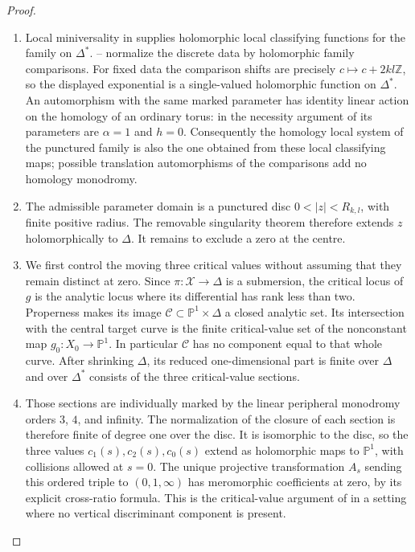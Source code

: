 \begin{proof}

\begin{enumerate}[label={$\langle1\rangle$\arabic*.},leftmargin=*]
\item Local miniversality in  supplies holomorphic local
classifying functions for the family on $\Delta^*$.
-- normalize the discrete data by holomorphic
family comparisons.  For fixed data the comparison shifts
are precisely $c\mapsto c+2kl\mathbb Z$, so the displayed
exponential is a single-valued holomorphic function on
$\Delta^*$.  An automorphism with the same marked parameter
has identity linear action on the homology of an ordinary
torus: in the necessity argument of  its parameters
are $\alpha=1$ and $h=0$.  Consequently the homology local
system of the punctured family is also the one obtained
from these local classifying maps; possible translation
automorphisms of the comparisons add no homology monodromy.

\item The admissible parameter domain is a punctured disc
$0<|z|<R_{k,l}$, with finite positive radius.  The removable
singularity theorem therefore extends $z$ holomorphically
to $\Delta$.  It remains to exclude a zero at the centre.

\item We first control the moving three critical values without
assuming that they remain distinct at zero.  Since
$\pi:\mathcal X\to\Delta$ is a submersion, the critical
locus of $g$ is the analytic locus where its differential
has rank less than two.  Properness makes its image
\(\mathcal C\subset\mathbb P^1\times\Delta\) a closed
analytic set.  Its intersection with the central target
curve is the finite critical-value set of the nonconstant
map $g_0:X_0\to\mathbb P^1$.  In particular
$\mathcal C$ has no component equal to that whole curve.
After shrinking $\Delta$, its reduced one-dimensional
part is finite over $\Delta$ and over $\Delta^*$ consists
of the three critical-value sections.

\item Those sections are individually marked by the linear
peripheral monodromy orders $3$, $4$, and infinity.
The normalization of the closure of each section is
therefore finite of degree one over the disc.  It is
isomorphic to the disc, so the three values
$c_1(s),c_2(s),c_0(s)$ extend as holomorphic maps to
$\mathbb P^1$, with collisions allowed at $s=0$.
The unique projective transformation $A_s$ sending this
ordered triple to $(0,1,\infty)$ has meromorphic
coefficients at zero, by its explicit cross-ratio formula.
This is the critical-value argument of  in a setting
where no vertical discriminant component is present.


\end{enumerate}
\end{proof}
